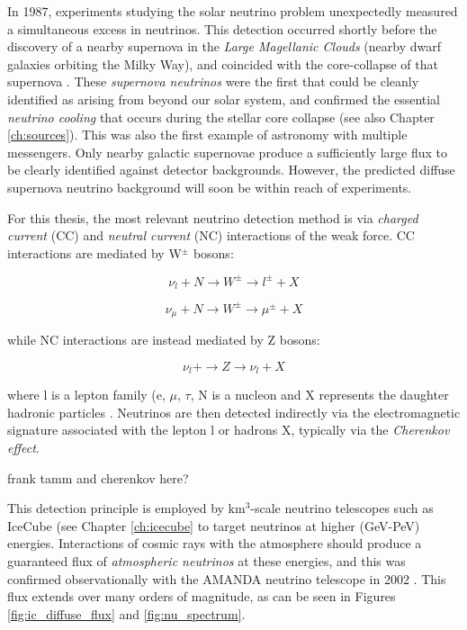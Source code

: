 In 1987, experiments studying the solar neutrino problem unexpectedly measured a simultaneous excess in neutrinos. This detection occurred shortly before the discovery of a nearby supernova in the \emph{Large Magellanic Clouds} (nearby dwarf galaxies orbiting the Milky Way), and coincided with the core-collapse of that supernova . These \emph{supernova neutrinos} were the first that could be cleanly identified as arising from beyond our solar system, and confirmed the essential \emph{neutrino cooling} that occurs during the stellar core collapse (see also Chapter \ref{ch:sources}). This was also the first example of astronomy with multiple messengers. Only nearby galactic supernovae produce a sufficiently large flux to be clearly identified against detector backgrounds. However, the predicted diffuse supernova neutrino background will soon be within reach of experiments.

For this thesis, the most relevant neutrino detection method is via \emph{charged current} (CC) and \emph{neutral current} (NC) interactions of the weak force. CC interactions are mediated by W$^{\pm}$ bosons:

\begin{equation}
	\nu_{l} + N \rightarrow W^{\pm} \rightarrow l^{\pm} + X
\end{equation}

\begin{equation}
	\nu_{\mu} + N \rightarrow W^{\pm} \rightarrow \mu^{\pm} + X
\end{equation}

while NC interactions are instead mediated by Z bosons:

\begin{equation}
	\nu_{l} + \rightarrow Z \rightarrow \nu_{l} + X
\end{equation}

where l is a lepton family (e, $\mu$, $\tau$, N is a nucleon and X represents the daughter hadronic particles \cite{spurio_18}. Neutrinos are then detected indirectly via the electromagnetic signature associated with the lepton l or hadrons X, typically via the \emph{Cherenkov effect}. 

frank tamm and cherenkov here?

This detection principle is employed by km$^{3}$-scale neutrino telescopes such as IceCube (see Chapter \ref{ch:icecube} to target neutrinos at higher (GeV-PeV) energies. Interactions of cosmic rays with the atmosphere should produce a guaranteed flux of \emph{atmospheric neutrinos} at these energies, and this was confirmed observationally with the AMANDA neutrino telescope in 2002 . This flux extends over many orders of magnitude, as can be seen in Figures \ref{fig:ic_diffuse_flux} and \ref{fig:nu_spectrum}. 

